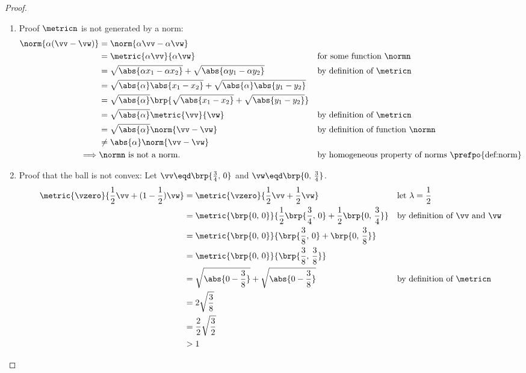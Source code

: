 {\begin{proof}
\begin{enumerate}
  \item Proof $\metricn$ is not generated by a norm:
    \begin{align*}
      \norm{\alpha(\vv-\vw)}
        &= \norm{\alpha\vv-\alpha\vw}
      \\&= \metric{\alpha\vv}{\alpha\vw}
        && \text{for some function $\normn$}
      \\&= \sqrt{\abs{\alpha x_1- \alpha x_2}} + \sqrt{\abs{\alpha y_1- \alpha y_2}}
        && \text{by definition of $\metricn$}
      \\&= \sqrt{\abs{\alpha}\abs{ x_1- x_2}} + \sqrt{\abs{\alpha}\abs{y_1- y_2}}
      \\&= \sqrt{\abs{\alpha}}\brp{\sqrt{\abs{ x_1- x_2}} + \sqrt{\abs{y_1- y_2}}}
      \\&= \sqrt{\abs{\alpha}} \metric{\vv}{\vw}
        && \text{by definition of $\metricn$}
      \\&= \sqrt{\abs{\alpha}} \norm{\vv-\vw}
        && \text{by definition of function $\normn$}
      \\&\ne  \abs{\alpha} \norm{\vv-\vw}
      \\\implies & \normn \text{ is not a norm.}
        && \text{by homogeneous property of norms \prefpo{def:norm}}
    \end{align*}

  \item Proof that the ball is not convex:
Let $\vv\eqd\brp{\frac{3}{4},\,0}$ and $\vw\eqd\brp{0,\,\frac{3}{4}}$.
\begin{align*}
  \metric{\vzero}{\frac{1}{2}\vv+(1-\frac{1}{2})\vw}
    &= \metric{\vzero}{\frac{1}{2}\vv+\frac{1}{2}\vw}
    && \text{let $\lambda=\frac{1}{2}$}
  \\&= \metric{\brp{0,\,0}}{\frac{1}{2}\brp{\frac{3}{4},\,0}+\frac{1}{2}\brp{0,\,\frac{3}{4}}}
    && \text{by definition of $\vv$ and $\vw$}
  \\&= \metric{\brp{0,\,0}}{\brp{\frac{3}{8},\,0}+\brp{0,\,\frac{3}{8}}}
  \\&= \metric{\brp{0,\,0}}{\brp{\frac{3}{8},\,\frac{3}{8}}}
  \\&= \sqrt{\abs{0-\frac{3}{8}}} + \sqrt{\abs{0-\frac{3}{8}}}
    && \text{by definition of $\metricn$}
  \\&= 2\sqrt{\frac{3}{8}}
  \\&= \frac{2}{2} \sqrt{\frac{3}{2}}
  \\&> 1
\end{align*}
\end{enumerate}
\end{proof}




}
